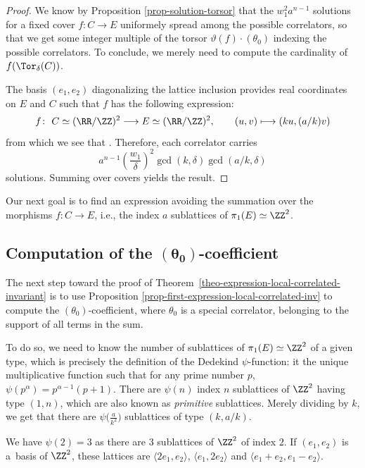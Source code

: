 \begin{proof}
We know by Proposition \ref{prop-solution-torsor} that the $w_1^2 a^{n-1}$ solutions for a fixed cover $f\colon C\to E$ uniformely spread among the possible correlators, so that we get some integer multiple of the torsor $\vartheta(f)\cdot(\theta_0)$ indexing the possible correlators. To conclude, we merely need to compute the cardinality of $f(\Tor_\delta(C))$.

The basis $(e_1,e_2)$ diagonalizing the lattice inclusion provides real coordinates on $E$ and $C$ such that $f$ has the following expression:
\[
f \colon \ C\simeq (\RR/\ZZ)^2 \longrightarrow E\simeq (\RR/\ZZ)^2, \qquad
 (u,v) \longmapsto (ku,(a/k)v )
 \]
from which we see that . Therefore, each correlator carries
\[
a^{n-1}\left(\frac{w_1}{\delta}\right)^2\gcd(k,\delta)\gcd(a/k,\delta)
\]
 solutions. Summing over covers yields the result.
\end{proof}

Our next goal is to find an expression avoiding the summation over the morphisms $f\colon C\to E$, i.e., the index $a$ sublattices of $\pi_1(E)\simeq\ZZ^2$.



\subsection[Computation of the (theta\_0)-coefficient]{Computation of the $\boldsymbol{(\theta_0)}$-coefficient}
\label{sec-0-coeff}

The next step toward the proof of Theorem~\ref{theo-expression-local-correlated-invariant} is to use Proposition \ref{prop-first-expression-local-correlated-inv} to compute the $(\theta_0)$-coefficient, where $\theta_0$ is a special correlator, belonging to the support of all terms in the sum.

To do so, we need to know the number of sublattices of $\pi_1(E)\simeq\ZZ^2$ of a given type, which is precisely the definition of the Dedekind $\psi$-function: it the unique multiplicative function such that for any prime number $p$, $\psi(p^\alpha)=p^{\alpha-1}(p+1)$. There are $\psi(n)$ index $n$ sublattices of $\ZZ^2$ having type $(1,n)$, which are also known as \textit{primitive} sublattices. Merely dividing by $k$, we get that there are $\psi\bigl(\frac{a}{k^2}\bigr)$ sublattices of type $(k,a/k)$.

\begin{expl}
We have $\psi(2)=3$ as there are $3$ sublattices of $\ZZ^2$ of index $2$. If $(e_1,e_2)$ is a~basis of $\ZZ^2$, these lattices are $\langle 2e_1,e_2\rangle$, $\langle e_1,2e_2\rangle$ and $\langle e_1+e_2,e_1-e_2\rangle$.
\end{expl}

